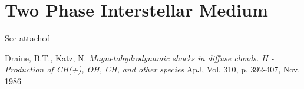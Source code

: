 \documentclass[a4paper]{article}
\begin{document}
\section{Two Phase Interstellar Medium}
See attached

\begin{thebibliography}{9}

  Draine, B.T., Katz, N.
  \textit{Magnetohydrodynamic shocks in diffuse clouds. II - 
          Production of CH(+), OH, CH, and other species}
  ApJ,
  Vol. 310, p. 392-407,
  Nov. 1986

\end{thebibliography}
\end{document}
